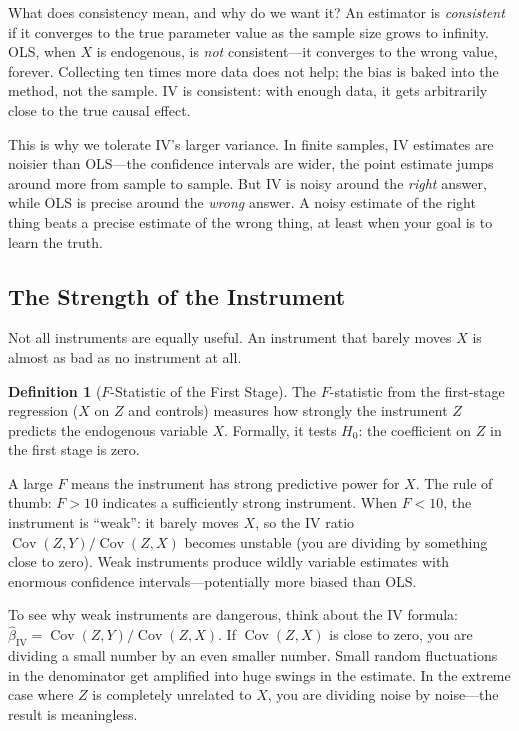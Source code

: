 \documentclass[11pt,a4paper]{article}
\theoremstyle{definition}
\newtheorem{definition}{Definition}[section]
\theoremstyle{plain}
\theoremstyle{remark}
\newcommand{\Cov}{\operatorname{Cov}}
\newcommand{\biv}{\hat{\beta}_{\text{IV}}}
\begin{document}
What does consistency mean, and why do we want it? An estimator is \emph{consistent} if it converges to the true parameter value as the sample size grows to infinity. OLS, when $X$ is endogenous, is \emph{not} consistent---it converges to the wrong value, forever. Collecting ten times more data does not help; the bias is baked into the method, not the sample. IV is consistent: with enough data, it gets arbitrarily close to the true causal effect.

This is why we tolerate IV's larger variance. In finite samples, IV estimates are noisier than OLS---the confidence intervals are wider, the point estimate jumps around more from sample to sample. But IV is noisy around the \emph{right} answer, while OLS is precise around the \emph{wrong} answer. A noisy estimate of the right thing beats a precise estimate of the wrong thing, at least when your goal is to learn the truth.

\subsection{The Strength of the Instrument}

Not all instruments are equally useful. An instrument that barely moves $X$ is almost as bad as no instrument at all.

\begin{definition}[$F$-Statistic of the First Stage]
The $F$-statistic from the first-stage regression ($X$ on $Z$ and controls) measures how strongly the instrument $Z$ predicts the endogenous variable $X$. Formally, it tests $H_0$: the coefficient on $Z$ in the first stage is zero.

A large $F$ means the instrument has strong predictive power for $X$. The rule of thumb: $F > 10$ indicates a sufficiently strong instrument. When $F < 10$, the instrument is ``weak'': it barely moves $X$, so the IV ratio $\Cov(Z,Y)/\Cov(Z,X)$ becomes unstable (you are dividing by something close to zero). Weak instruments produce wildly variable estimates with enormous confidence intervals---potentially more biased than OLS.
\end{definition}

To see why weak instruments are dangerous, think about the IV formula: $\biv = \Cov(Z,Y)/\Cov(Z,X)$. If $\Cov(Z,X)$ is close to zero, you are dividing a small number by an even smaller number. Small random fluctuations in the denominator get amplified into huge swings in the estimate. In the extreme case where $Z$ is completely unrelated to $X$, you are dividing noise by noise---the result is meaningless.
\end{document}
